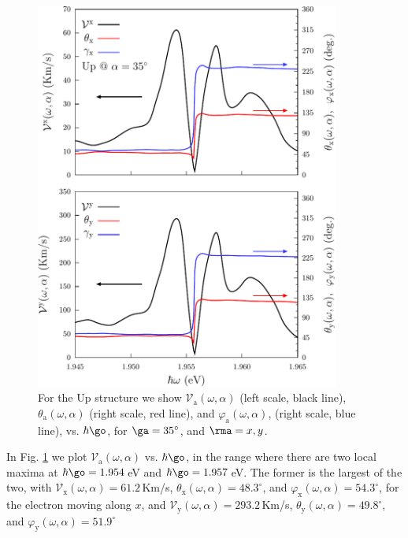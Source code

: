 \documentclass[floatfix,prb,aps,superscriptaddress,showpacs,11pt,preprint,letterpaper]{revtex4}
\def\tama{10cm}
\begin{document}
\begin{figure}[t]
\centering
\includegraphics[width=\tama]{upplots/up-vx-vy-w2}
\caption{For the Up structure we show $\mathcal{V}_{\mathrm{a}}
(\omega,\alpha)$ (left scale, black line), $\theta_{\mathrm{a}}
(\omega,\alpha)$ (right scale, red line), and $\varphi_{\mathrm{a}}
(\omega,\alpha)$, (right scale, blue line), vs. $\hbar\go$, for
$\ga=35^\circ$, and $\rma=x,y$. }
\label{fig:up-vx-vy-w2}
\end{figure}
In Fig. \ref{fig:up-vx-vy-w2} we plot $\mathcal{V}_{\mathrm{a}}
(\omega,\alpha)$ vs. $\hbar\go$, in the range where there are two local maxima
at $\hbar\go=1.954$\,eV and $\hbar\go=1.957$\,eV.
% 
The former is the largest of the two, with
$\mathcal{V}_{\mathrm{x}} (\omega,\alpha)=61.2$\,Km/s,
$\theta_{\mathrm{x}} (\omega,\alpha)=48.3^{\circ}$, and 
$\varphi_{\mathrm{x}} (\omega,\alpha)=54.3^{\circ}$,
for the electron moving along $x$, and
$\mathcal{V}_{\mathrm{y}} (\omega,\alpha)=293.2$\,Km/s,
$\theta_{\mathrm{y}} (\omega,\alpha)=49.8^{\circ}$, and 
$\varphi_{\mathrm{y}} (\omega,\alpha)=51.9^{\circ}$
\end{document}
